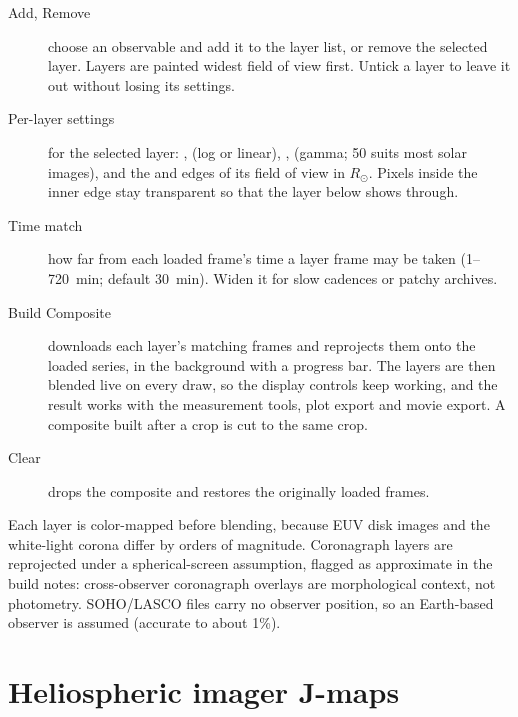 \begin{description}
  \item[Add, Remove] choose an observable and add it to the layer list, or remove the
    selected layer. Layers are painted widest field of view first. Untick a layer to leave it
    out without losing its settings.
  \item[Per-layer settings] for the selected layer: ,  (log or
    linear), ,  (gamma; 50 suits most solar images), and the
     and  edges of its field of view in \(R_\odot\). Pixels inside the
    inner edge stay transparent so that the layer below shows through.
  \item[Time match] how far from each loaded frame's time a layer frame may be taken
    (1--720~min; default 30~min). Widen it for slow cadences or patchy archives.
  \item[Build Composite] downloads each layer's matching frames and reprojects them onto the
    loaded series, in the background with a progress bar. The layers are then blended live on
    every draw, so the display controls keep working, and the result works with the
    measurement tools, plot export and movie export. A composite built after a crop is cut to
    the same crop.
  \item[Clear] drops the composite and restores the originally loaded frames.
\end{description}

\begin{note}
  Each layer is color-mapped before blending, because EUV disk images and the white-light
  corona differ by orders of magnitude. Coronagraph layers are reprojected under a
  spherical-screen assumption, flagged as approximate in the build notes: cross-observer
  coronagraph overlays are morphological context, not photometry. SOHO/LASCO files carry no
  observer position, so an Earth-based observer is assumed (accurate to about 1\%).
\end{note}

\section{Heliospheric imager J-maps}
\label{sec:jmap}

